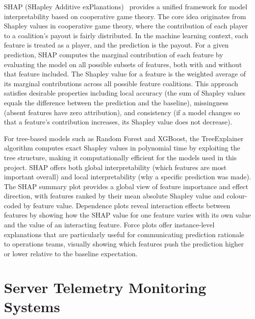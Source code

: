 \documentclass[12pt,letterpaper]{report}
\begin{document}
SHAP (SHapley Additive exPlanations)~\cite{lundberg2017} provides a unified framework for model interpretability based on cooperative game theory. The core idea originates from Shapley values in cooperative game theory, where the contribution of each player to a coalition's payout is fairly distributed. In the machine learning context, each feature is treated as a player, and the prediction is the payout. For a given prediction, SHAP computes the marginal contribution of each feature by evaluating the model on all possible subsets of features, both with and without that feature included. The Shapley value for a feature is the weighted average of its marginal contributions across all possible feature coalitions. This approach satisfies desirable properties including local accuracy (the sum of Shapley values equals the difference between the prediction and the baseline), missingness (absent features have zero attribution), and consistency (if a model changes so that a feature's contribution increases, its Shapley value does not decrease).

For tree-based models such as Random Forest and XGBoost, the TreeExplainer algorithm computes exact Shapley values in polynomial time by exploiting the tree structure, making it computationally efficient for the models used in this project. SHAP offers both global interpretability (which features are most important overall) and local interpretability (why a specific prediction was made). The SHAP summary plot provides a global view of feature importance and effect direction, with features ranked by their mean absolute Shapley value and colour-coded by feature value. Dependence plots reveal interaction effects between features by showing how the SHAP value for one feature varies with its own value and the value of an interacting feature. Force plots offer instance-level explanations that are particularly useful for communicating prediction rationale to operations teams, visually showing which features push the prediction higher or lower relative to the baseline expectation.

\section{Server Telemetry Monitoring Systems}
\end{document}
